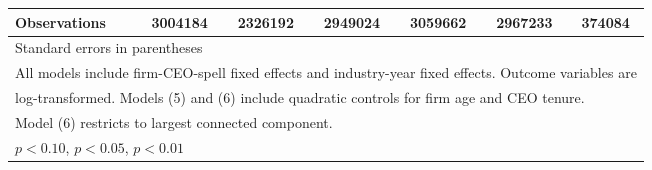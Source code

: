 \begin{table}[htbp]
\begin{tabular}{l*{6}{c}}
\midrule
Observations        &     3004184         &     2326192         &     2949024         &     3059662         &     2967233         &      374084         \\
\bottomrule
\multicolumn{7}{l}{\footnotesize Standard errors in parentheses}\\
\multicolumn{7}{l}{\footnotesize All models include firm-CEO-spell fixed effects and industry-year fixed effects. Outcome variables are}\\
\multicolumn{7}{l}{\footnotesize log-transformed. Models (5) and (6) include quadratic controls for firm age and CEO tenure.}\\
\multicolumn{7}{l}{\footnotesize Model (6) restricts to largest connected component.}\\
\multicolumn{7}{l}{\footnotesize \sym{*} \(p<0.10\), \sym{**} \(p<0.05\), \sym{***} \(p<0.01\)}\\
\end{tabular}
\end{table}
